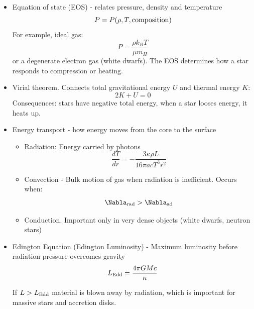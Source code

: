 \begin{itemize}
    \item Equation of state (EOS) - relates pressure, density and temperature\
    \begin{equation*}
        P = P (\rho, T, {\rm composition})
    \end{equation*}
    For example, ideal gas:
    \begin{equation*}
        P = \frac{\rho k_B T}{\mu m_{H}}
    \end{equation*}
    or a degenerate electron gas (white dwarfs). The EOS determines how a star responds to compression or heating.

    \item Virial theorem. Connects total gravitational energy $U$ and thermal energy $K$:
    \begin{equation*}
        2K + U = 0
    \end{equation*}
    Consequences: stars have negative total energy, when a star looses energy, it heats up.

    \item Energy transport -  how energy moves from the core to the surface
    \begin{itemize}
        \item Radiation: Energy carried by photons
        \begin{equation*}
            \frac{dT}{dr} = - \frac{3 \kappa \rho L}{16 \pi a c T^3 r^2}
        \end{equation*}

        \item Convection - Bulk motion of gas when radiation is inefficient. Occurs when:
        \begin{equation*}
            \Nabla_{\rm rad} > \Nabla_{\rm ad}
        \end{equation*}

        \item Conduction. Important only in very dense objects (white dwarfs, neutron stars)
    \end{itemize}

    \item Edington Equation (Edington Luminosity) - Maximum luminosity before radiation pressure overcomes gravity
    \begin{equation*}
        L_{\rm Edd} = \frac{4 \pi G M c}{\kappa}
    \end{equation*}

    If $L > L_{\rm Edd}$ material is blown away by radiation, which is important for massive stars and accretion disks.


\end{itemize}
